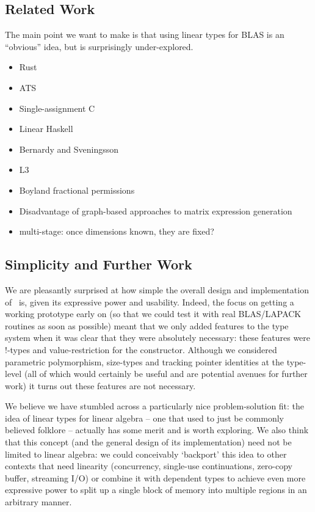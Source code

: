 \subsection{Related Work}

The main point we want to make is that using linear types for BLAS
is an ``obvious'' idea, but is surprisingly under-explored. 

\begin{itemize}
\item Rust
\item ATS
\item Single-assignment C 
\item Linear Haskell
\item Bernardy and Sveningsson
\item L3
\item Boyland fractional permissions
\item Disadvantage of graph-based approaches to matrix expression generation
\item multi-stage: once dimensions known, they are fixed?
\end{itemize}

\subsection{Simplicity and Further Work}

We are pleasantly surprised at how simple the overall design and implementation
of \lang\ is, given its expressive power and usability. Indeed, the focus on
getting a working prototype early on (so that we could test it with real
BLAS/LAPACK routines as soon as possible) meant that we only added features to
the type system when it was clear that they were absolutely necessary: these
features were !-types and value-restriction for the  constructor.
Although we considered parametric polymorphism, size-types and tracking pointer
identities at the type-level\cite{morrisett} (all of which would certainly be
useful and are potential avenues for further work) it turns out these features
are not necessary.

We believe we have stumbled across a particularly nice problem-solution fit:
the idea of linear types for linear algebra -- one that used to just be
commonly believed folklore -- actually has some merit and is worth exploring.
We also think that this concept (and the general design of its implementation)
need not be limited to linear algebra: we could conceivably `backport' this
idea to other contexts that need linearity (concurrency, single-use
continuations, zero-copy buffer, streaming I/O) or combine it with dependent
types to achieve even more expressive power to split up a single block of
memory into multiple regions in an arbitrary manner\cite{space_monads}.
